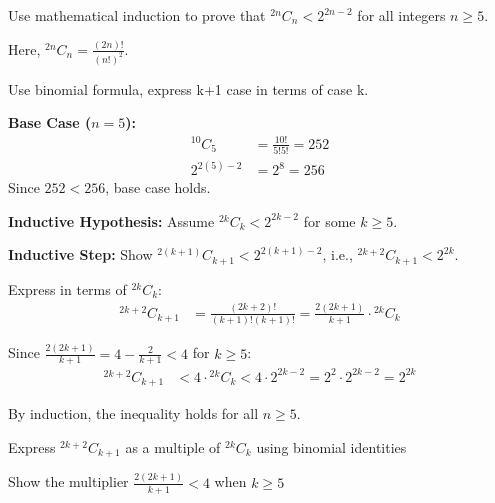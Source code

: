 \begin{problem}
Use mathematical induction to prove that ${}^{2n}C_n < 2^{2n-2}$ for all integers $n \geq 5$.

Here, ${}^{2n}C_n = \frac{(2n)!}{(n!)^2}$.

\end{problem}

\begin{hint}
Use binomial formula, express k+1 case in terms of case k.
\end{hint}

\begin{solution}
\textbf{Base Case ($n=5$):}
\begin{align*}
{}^{10}C_5 &= \frac{10!}{5!5!} = 252 \\
2^{2(5)-2} &= 2^8 = 256
\end{align*}
Since $252 < 256$, base case holds.

\textbf{Inductive Hypothesis:} Assume ${}^{2k}C_k < 2^{2k-2}$ for some $k \geq 5$.

\textbf{Inductive Step:} Show ${}^{2(k+1)}C_{k+1} < 2^{2(k+1)-2}$, i.e., ${}^{2k+2}C_{k+1} < 2^{2k}$.

Express in terms of ${}^{2k}C_k$:
\begin{align*}
{}^{2k+2}C_{k+1} &= \frac{(2k+2)!}{(k+1)!(k+1)!} = \frac{2(2k+1)}{k+1} \cdot {}^{2k}C_k
\end{align*}

Since $\frac{2(2k+1)}{k+1} = 4 - \frac{2}{k+1} < 4$ for $k \geq 5$:
\begin{align*}
{}^{2k+2}C_{k+1} &< 4 \cdot {}^{2k}C_k < 4 \cdot 2^{2k-2} = 2^2 \cdot 2^{2k-2} = 2^{2k}
\end{align*}

By induction, the inequality holds for all $n \geq 5$.
\end{solution}

\begin{takeaways}
\item Express ${}^{2k+2}C_{k+1}$ as a multiple of ${}^{2k}C_k$ using binomial identities
\item Show the multiplier $\frac{2(2k+1)}{k+1} < 4$ when $k \geq 5$
\end{takeaways}
